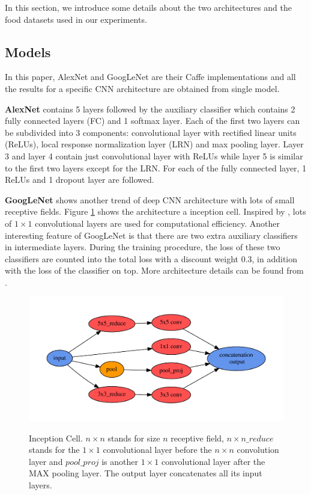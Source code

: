 ﻿In this section, we introduce some details about the two architectures and the food datasets used in our experiments.
\subsection{Models}
In this paper, AlexNet and GoogLeNet are their Caffe \cite{jia2014caffe} implementations and all the results for a specific CNN architecture are obtained from single model.

\textbf{AlexNet}
 contains 5 layers followed by the auxiliary classifier which contains 2 fully connected layers (FC) and 1 softmax layer. Each of the first two layers can be subdivided into 3 components: convolutional layer with rectified linear units (ReLUs), local response normalization layer (LRN) and max pooling layer. Layer 3 and layer 4 contain just convolutional layer with ReLUs while layer 5 is similar to the first two layers except for the LRN. For each of the fully connected layer, 1 ReLUs and 1 dropout \cite{srivastava2014dropout} layer are followed.

 \textbf{GoogLeNet}
  shows another trend of deep CNN architecture with lots of small receptive fields. Figure \ref{incept} shows the architecture a inception cell. Inspired by \cite{linNiN}, lots of $1\times 1$ convolutional layers are used for computational efficiency. Another interesting feature of GoogLeNet is that there are two extra auxiliary classifiers in intermediate layers. During the training procedure, the loss of these two classifiers are counted into the total loss with a discount weight 0.3, in addition with the loss of the classifier on top. More architecture details can be found from \cite{szegedy2014going}.

\begin{figure}
  \centering
  \includegraphics[scale=.45]{fig/inception.pdf}\\
  \caption{Inception Cell. $n\times n$ stands for size $n$ receptive field, $n\times n\_reduce$ stands for the $1\times 1$ convolutional layer before the $n\times n$ convolution layer and $pool\_proj$ is another $1\times 1$ convolutional layer after the MAX pooling layer. The output layer concatenates all its input layers.}\label{incept}
\end{figure}

